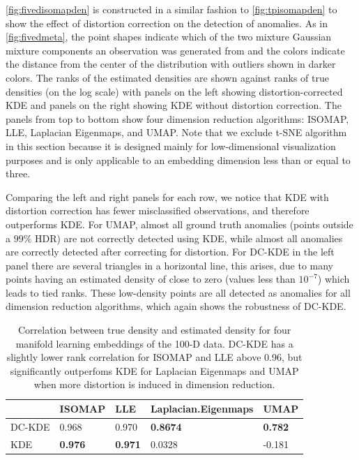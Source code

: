 \documentclass[
]{article}
\begin{document}
\autoref{fig:fivedisomapden} is constructed in a similar fashion to
\autoref{fig:tpisomapden} to show the effect of distortion correction on
the detection of anomalies. As in \autoref{fig:fivedmeta}, the point
shapes indicate which of the two mixture Gaussian mixture components an
observation was generated from and the colors indicate the distance from
the center of the distribution with outliers shown in darker colors. The
ranks of the estimated densities are shown against ranks of true
densities (on the log scale) with panels on the left showing
distortion-corrected KDE and panels on the right showing KDE without
distortion correction. The panels from top to bottom show four dimension
reduction algorithms: ISOMAP, LLE, Laplacian Eigenmaps, and UMAP. Note
that we exclude t-SNE algorithm in this section because it is designed
mainly for low-dimensional visualization purposes and is only applicable
to an embedding dimension less than or equal to three.

Comparing the left and right panels for each row, we notice that KDE
with distortion correction has fewer misclassified observations, and
therefore outperforms KDE. For UMAP, almost all ground truth anomalies
(points outside a \(99\%\) HDR) are not correctly detected using KDE,
while almost all anomalies are correctly detected after correcting for
distortion. For DC-KDE in the left panel there are several triangles in
a horizontal line, this arises, due to many points having an estimated
density of close to zero (values less than \(10^{-7}\)) which leads to
tied ranks. These low-density points are all detected as anomalies for
all dimension reduction algorithms, which again shows the robustness of
DC-KDE.

\begin{table}

\caption{\label{tab:fivedcors}Correlation between true density and estimated density for four manifold learning embeddings of the 100-D data. DC-KDE has a slightly lower rank correlation for ISOMAP and LLE above 0.96, but significantly outperfoms KDE for Laplacian Eigenmaps and UMAP when more distortion is induced in dimension reduction.}
\centering
\begin{tabular}[t]{l>{}l>{}l>{}l>{}l}
\toprule
  & ISOMAP & LLE & Laplacian.Eigenmaps & UMAP\\
\midrule
DC-KDE & 0.968 & 0.970 & \textbf{0.8674} & \textbf{0.782}\\
KDE & \textbf{0.976} & \textbf{0.971} & 0.0328 & -0.181\\
\bottomrule
\end{tabular}
\end{table}
\end{document}
